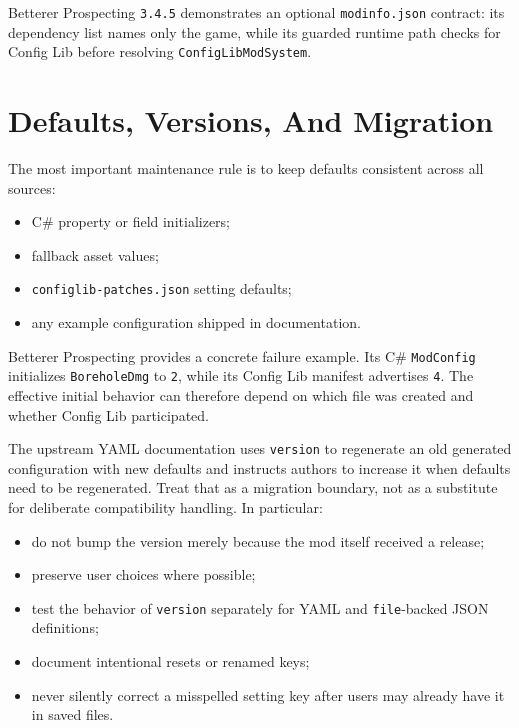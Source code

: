 \documentclass[
  11pt,
  letterpaper,
  titlepage]{article}
\providecommand{\tightlist}{%
  \setlength{\itemsep}{0pt}\setlength{\parskip}{0pt}}
\begin{document}
Betterer Prospecting \texttt{3.4.5} demonstrates an optional
\texttt{modinfo.json} contract: its dependency list names only the game,
while its guarded runtime path checks for Config Lib before resolving
\texttt{ConfigLibModSystem}.

\section{Defaults, Versions, And
Migration}\label{defaults-versions-and-migration}

The most important maintenance rule is to keep defaults consistent
across all sources:

\begin{itemize}
\tightlist
\item
  C\# property or field initializers;
\item
  fallback asset values;
\item
  \texttt{configlib-patches.json} setting defaults;
\item
  any example configuration shipped in documentation.
\end{itemize}

Betterer Prospecting provides a concrete failure example. Its C\#
\texttt{ModConfig} initializes \texttt{BoreholeDmg} to \texttt{2}, while
its Config Lib manifest advertises \texttt{4}. The effective initial
behavior can therefore depend on which file was created and whether
Config Lib participated.

The upstream YAML documentation uses \texttt{version} to regenerate an
old generated configuration with new defaults and instructs authors to
increase it when defaults need to be regenerated. Treat that as a
migration boundary, not as a substitute for deliberate compatibility
handling. In particular:

\begin{itemize}
\tightlist
\item
  do not bump the version merely because the mod itself received a
  release;
\item
  preserve user choices where possible;
\item
  test the behavior of \texttt{version} separately for YAML and
  \texttt{file}-backed JSON definitions;
\item
  document intentional resets or renamed keys;
\item
  never silently correct a misspelled setting key after users may
  already have it in saved files.
\end{itemize}
\end{document}
